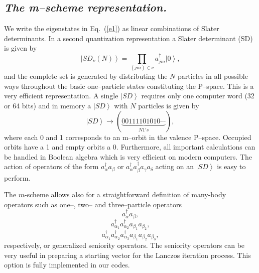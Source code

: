 \documentclass{article}
\newcommand{\be}{\begin{equation}}
\newcommand{\ee}{\end{equation}}
\newcommand{\ket}[1]{\left| #1 \right\rangle}
\begin{document}
\subsection{\it The m--scheme representation.}
%
We write the eigenstates in Eq.~(\ref{e1})  as  linear combinations
of Slater determinants. In a second quantization representation
a Slater determinant (SD) is given by
%
\be
\ket{SD_{\nu}(N)} = \prod_{(jm)\in {\nu}} a_{jm}^{\dagger}\ket{0},
\ee
%
and the complete set is generated by distributing the $N$ particles
in all possible ways throughout the basic one--particle states constituting
the P--space. This is a very efficient
representation. A single $\ket{SD}$ requires only one  computer word
(32 or 64 bits) and  in memory a $\ket{SD}$ with $N$ particles
is given by
%
\be
\ket{SD} \longrightarrow (\underbrace{00111101010 \cdots}_{N 1's}),
\ee
%
where each 0 and 1 corresponds to an m--orbit in the valence
P--space. Occupied orbits  have a 1 and empty orbits a 0.
 Furthermore, all important calculations  can
be handled in Boolean algebra which is very efficient on modern computers.
The action  of operators of the form $a_{\alpha}^{\dagger} a_{\beta}$ or
$a_{\alpha}^{\dagger} a_{\beta}^{\dagger} a_{\gamma} a_{\delta}$
acting on an $\ket{SD}$ is easy to perform.

The $m$-scheme allows also for a straightforward definition of many-body operators 
such as one--, two-- and three--particle operators
     \begin{equation}
     a_{\alpha}^{\dagger} a_{\beta},
     \end{equation}
\begin{equation}
     a_{\alpha_1}^{\dagger}a_{\alpha_2}^{\dagger} a_{\beta_1} a_{\beta_2} ,
\end{equation}
\begin{equation}
     a_{\alpha_1}^{\dagger}a_{\alpha_2}^{\dagger}a_{\alpha_3}^{\dagger}
            a_{\beta_1} a_{\beta_2} a_{\beta_3},
\end{equation}
respectively, 
or 
generalized seniority operators. The seniority operators can be very useful in preparing a
starting vector for the Lanczos iteration process. This option is fully 
implemented in our codes. 
\end{document}
